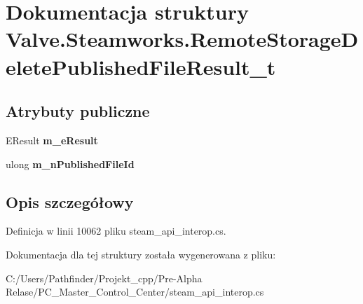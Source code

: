 \hypertarget{struct_valve_1_1_steamworks_1_1_remote_storage_delete_published_file_result__t}{}\section{Dokumentacja struktury Valve.\+Steamworks.\+Remote\+Storage\+Delete\+Published\+File\+Result\+\_\+t}
\label{struct_valve_1_1_steamworks_1_1_remote_storage_delete_published_file_result__t}
\subsection*{Atrybuty publiczne}
\begin{DoxyCompactItemize}
\item 
\mbox{\label{struct_valve_1_1_steamworks_1_1_remote_storage_delete_published_file_result__t_a887b32bc0886638138592becbc001f6c}} 
E\+Result {\bfseries m\+\_\+e\+Result}
\item 
\mbox{\label{struct_valve_1_1_steamworks_1_1_remote_storage_delete_published_file_result__t_a5aa262550ffb7500cd80c652261bb5fd}} 
ulong {\bfseries m\+\_\+n\+Published\+File\+Id}
\end{DoxyCompactItemize}


\subsection{Opis szczegółowy}


Definicja w linii 10062 pliku steam\+\_\+api\+\_\+interop.\+cs.



Dokumentacja dla tej struktury została wygenerowana z pliku\+:\begin{DoxyCompactItemize}
\item 
C\+:/\+Users/\+Pathfinder/\+Projekt\+\_\+cpp/\+Pre-\/\+Alpha Relase/\+P\+C\+\_\+\+Master\+\_\+\+Control\+\_\+\+Center/steam\+\_\+api\+\_\+interop.\+cs\end{DoxyCompactItemize}
